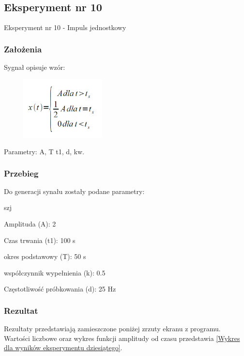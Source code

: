 \documentclass[12pt]{article}
\begin{document}
\subsection{Eksperyment nr 10}

Eksperyment nr 10 - Impuls jednostkowy

\subsubsection{Założenia}
Sygnał opisuje wzór:
\begin{figure}[h!]
 \centering
 \includegraphics[width=4.3cm]{SkowJWzor.PNG}
 \vspace{-0.3cm}
 \label{gw}
\end{figure}
\newpage
Parametry: A, T t1, d, kw.

\subsubsection{Przebieg}
Do generacji synału zostały podane parametry:

\begin{labeling}{szj}
\item [Amplituda (A):] 2
\item [Czas trwania (t1):] 100 s
\item [okres podstawowy (T):] 50 s
\item [współczynnik wypełnienia (k):] 0.5
\item [Częstotliwość próbkowania (d): ] 25 Hz
\end{labeling}

\subsubsection{Rezultat}
Rezultaty przedstawiają zamieszczone poniżej zrzuty ekranu z programu. Wartości liczbowe oraz wykres funkcji amplitudy od czasu przedstawia \ref{Wykres dla wyników eksperymentu dziesiątego}.
\end{document}
